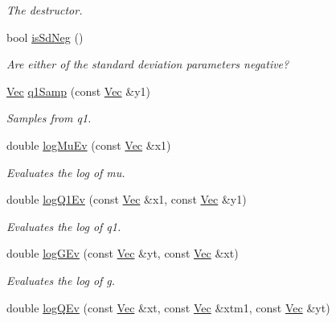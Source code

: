\begin{DoxyCompactItemize}
\begin{DoxyCompactList}\small\item\em The destructor. \end{DoxyCompactList}\item 
bool \hyperlink{classNAr1Filter_aee9f60c01d44bb0e54092a04be1fbb1a}{is\+Sd\+Neg} ()
\begin{DoxyCompactList}\small\item\em Are either of the standard deviation parameters negative? \end{DoxyCompactList}\item 
\hyperlink{pmfs_8h_a4c7df05c6f5e8a0d15ae14bcdbc07152}{Vec} \hyperlink{classNAr1Filter_a6ae702c69b4f3e7b2109f99e2fd5d8b7}{q1\+Samp} (const \hyperlink{pmfs_8h_a4c7df05c6f5e8a0d15ae14bcdbc07152}{Vec} \&y1)
\begin{DoxyCompactList}\small\item\em Samples from q1. \end{DoxyCompactList}\item 
double \hyperlink{classNAr1Filter_ac97b366af3d4def2b45d394fb85865f0}{log\+Mu\+Ev} (const \hyperlink{pmfs_8h_a4c7df05c6f5e8a0d15ae14bcdbc07152}{Vec} \&x1)
\begin{DoxyCompactList}\small\item\em Evaluates the log of mu. \end{DoxyCompactList}\item 
double \hyperlink{classNAr1Filter_af8eb2b66ff1806dd0d4c4ac1f7129a51}{log\+Q1\+Ev} (const \hyperlink{pmfs_8h_a4c7df05c6f5e8a0d15ae14bcdbc07152}{Vec} \&x1, const \hyperlink{pmfs_8h_a4c7df05c6f5e8a0d15ae14bcdbc07152}{Vec} \&y1)
\begin{DoxyCompactList}\small\item\em Evaluates the log of q1. \end{DoxyCompactList}\item 
double \hyperlink{classNAr1Filter_aed4a7fb8160aabe9a7dc702826ccae60}{log\+G\+Ev} (const \hyperlink{pmfs_8h_a4c7df05c6f5e8a0d15ae14bcdbc07152}{Vec} \&yt, const \hyperlink{pmfs_8h_a4c7df05c6f5e8a0d15ae14bcdbc07152}{Vec} \&xt)
\begin{DoxyCompactList}\small\item\em Evaluates the log of g. \end{DoxyCompactList}\item 
double \hyperlink{classNAr1Filter_ae42e9ccf333b8590bd79831be8083dcd}{log\+Q\+Ev} (const \hyperlink{pmfs_8h_a4c7df05c6f5e8a0d15ae14bcdbc07152}{Vec} \&xt, const \hyperlink{pmfs_8h_a4c7df05c6f5e8a0d15ae14bcdbc07152}{Vec} \&xtm1, const \hyperlink{pmfs_8h_a4c7df05c6f5e8a0d15ae14bcdbc07152}{Vec} \&yt)

\end{DoxyCompactItemize}
